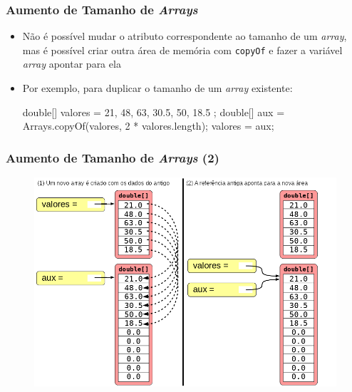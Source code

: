 \documentclass[xcolor={dvipsnames,table},aspectratio=169]{beamer}
\begin{document}
\begin{frame}[fragile]\frametitle{Aumento de Tamanho de \emph{Arrays}}
\begin{itemize}
	\item Não é possível mudar o atributo correspondente ao tamanho de um \emph{array}, mas é possível criar outra área de memória com \texttt{copyOf} e fazer a variável \emph{array} apontar para ela
	\item Por exemplo, para duplicar o tamanho de um \emph{array} existente:
{\small
\begin{javacode}
double[] valores = { 21, 48, 63, 30.5, 50, 18.5 };
double[] aux = Arrays.copyOf(valores, 2 * valores.length);
valores = aux;
\end{javacode}
}
\end{itemize}
\end{frame}

\begin{frame}[fragile]\frametitle{Aumento de Tamanho de \emph{Arrays} (2)}
\begin{figure}[h]
	\includegraphics[height=0.75\paperheight,center]{pucrs-ep-fprog-unidade_06-arrays-laminas-aumento.png}
\end{figure}
\end{frame}
\end{document}
